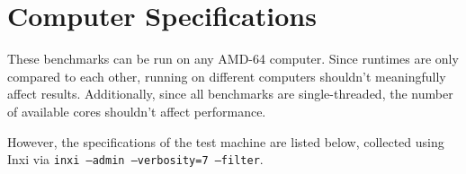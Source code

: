 \documentclass[12pt,letterpaper]{article}
\begin{document}
\appendix

\section{Computer Specifications}

These benchmarks can be run on any AMD-64 computer. Since runtimes are only
compared to each other, running on different computers shouldn't meaningfully
affect results. Additionally, since all benchmarks are single-threaded, the
number of available cores shouldn't affect performance.

However, the specifications of the test machine are listed below, collected
using Inxi via \texttt{inxi --admin --verbosity=7 --filter}.


\end{document}

